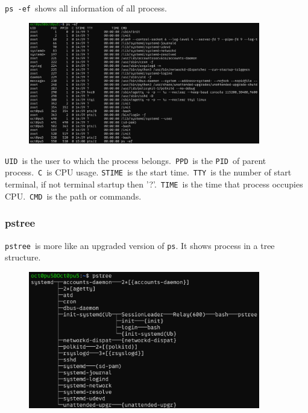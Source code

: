 \documentclass[12pt]{ctexart}
\begin{document}
\texttt{ps\ -ef}\ shows all information of all process.

\begin{figure}[H]
    \centering
    \includegraphics[width=0.9\textwidth,keepaspectratio]{assets/Linux/1.10 Linux process commands/1.png}
\end{figure}

\texttt{UID}\ is the user to which the process belongs.\ \texttt{PPD}\ is
the \texttt{PID}\ of parent process.\ \texttt{C}\ is CPU usage.
\texttt{STIME}\ is the start time.\ \texttt{TTY}\ is the number of start
terminal, if not terminal startup then '?'.\ \texttt{TIME}\ is the time
that process occupies CPU.\ \texttt{CMD}\ is the path or commands.

\subsubsection{\textbf{pstree}}

\texttt{pstree}\ is more like an upgraded version of \texttt{ps}. It
shows process in a tree structure.

\begin{figure}[H]
    \centering
    \includegraphics[width=0.9\textwidth,keepaspectratio]{assets/Linux/1.10 Linux process commands/2.png}
\end{figure}
\end{document}
